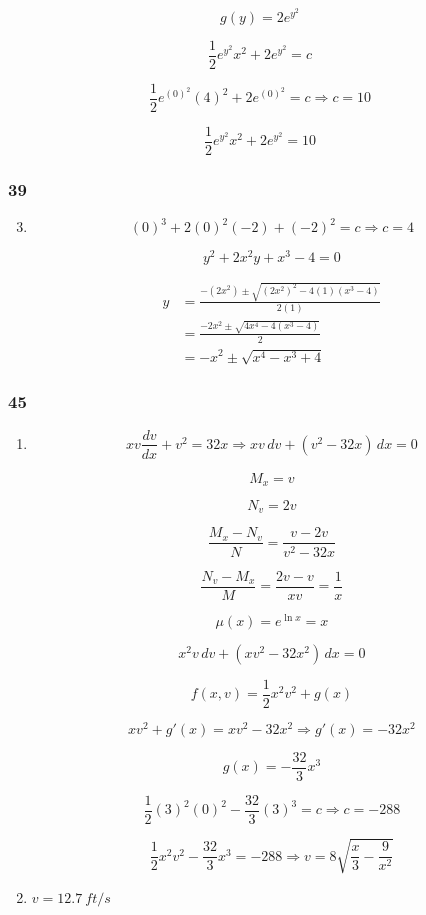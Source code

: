 \documentclass{article}
\begin{document}
\[g(y) = 2 e^{y^2}\]

\[\frac{1}{2} e^{y^2} x^2 + 2 e^{y^2} = c\]

\[\frac{1}{2} e^{(0)^2} (4)^2 + 2 e^{(0)^2} = c \Rightarrow c = 10\]

\[\frac{1}{2} e^{y^2} x^2 + 2 e^{y^2} = 10\]

\subsubsection{39}

\begin{enumerate}
  \setcounter{enumi}{2}
  \item

        \[(0)^3 + 2 (0)^2 (-2) + (-2)^2 = c \Rightarrow c = 4\]

        \[y^2 + 2 x^2 y + x^3 - 4 = 0\]

        \begin{align*}
          y & = \frac{-(2 x^2) \pm \sqrt{(2 x^2)^2 - 4 (1) (x^3 - 4)}}{2 (1)} \\
            & = \frac{-2 x^2 \pm \sqrt{4 x^4 - 4 (x^3 - 4)}}{2}               \\
            & = -x^2 \pm \sqrt{x^4 - x^3 + 4}
        \end{align*}
\end{enumerate}

\subsubsection{45}

\begin{enumerate}
  \item

        \[x v \frac{d v}{d x} + v^2 = 32 x \Rightarrow xv \,d v + (v^2 - 32 x) \,d x = 0\]

        \[M_x = v\]

        \[N_v = 2 v\]

        \[\frac{M_x - N_v}{N} = \frac{v - 2 v}{v^2 - 32 x}\]

        \[\frac{N_v - M_x}{M} = \frac{2 v - v}{x v} = \frac{1}{x}\]

        \[\mu(x) = e^{\ln x} = x\]

        \[x^2 v \,d v + (x v^2 - 32 x^2) \,d x = 0\]

        \[f(x, v) = \frac{1}{2} x^2 v^2 + g(x)\]

        \[x v^2 + g'(x) = x v^2 - 32 x^2 \Rightarrow g'(x) = -32 x^2\]

        \[g(x) = -\frac{32}{3} x^3\]

        \[\frac{1}{2} (3)^2 (0)^2 - \frac{32}{3} (3)^3 = c \Rightarrow c = -288\]

        \[\frac{1}{2} x^2 v^2 - \frac{32}{3} x^3 = -288 \Rightarrow v = 8 \sqrt{\frac{x}{3} - \frac{9}{x^2}}\]

  \item $v = \qty{12.7}{ft/s}$
\end{enumerate}
\end{document}
